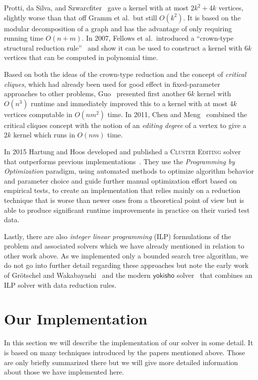 \documentclass[12pt,oneside,english,parskip=full,headings=small]{scrbook}
\theoremstyle{definition}
\begin{document}
Protti, da Silva, and Szwarcfiter~\cite{Protti} gave a kernel with at most $2k^2 + 4k$
vertices, slightly worse than that off Gramm et al.\ but still $O(k^2)$. It is based on the modular
decomposition of a graph and has the advantage of only requiring running time $O(n + m)$. In 2007,
Fellows et al.\ introduced a ``crown-type structural reduction rule''~\cite{Fellows} and show it
can be used to construct a kernel with $6k$ vertices that can be computed in polynomial time.

Based on both the ideas of the crown-type reduction and the concept of \emph{critical cliques},
which had already been used for good effect in fixed-parameter approaches to other problems,
Guo~\cite{Guo} presented first another $6k$ kernel with $O(n^3)$ runtime and immediately improved
this to a kernel with at most $4k$ vertices computable in $O(nm^2)$ time. In 2011, Chen and
Meng~\cite{ChenMeng} combined the critical cliques concept with the notion of an \emph{editing
degree} of a vertex to give a $2k$ kernel which runs in $O(nm)$ time.

In 2015 Hartung and Hoos developed and published a \textsc{Cluster Editing} solver that outperforms
previous implementations~\cite{HartungHoos}. They use the \emph{Programming by Optimization}
paradigm, using automated methods to optimize algorithm behavior and parameter choice and guide
further manual optimization effort based on empirical tests, to create an implementation that relies
mainly on a reduction technique that is worse than newer ones from a theoretical point of view but
is able to produce significant runtime improvements in practice on their varied test data.

Lastly, there are also \emph{integer linear programming} (ILP) formulations of the problem and
associated solvers which we have already mentioned in relation to other work above. As we
implemented only a bounded search tree algorithm, we do not go into further detail regarding these
approaches but note the early work of Grötschel and Wakabayashi~\cite{CuttingPlane} and the modern
$\mathsf{yokisho}$ solver~\cite{yokisho} that combines an ILP solver with data reduction rules.

\chapter{Our Implementation}

In this section we will describe the implementation of our solver in some detail. It is based on
many techniques introduced by the papers mentioned above. Those are only briefly summarized there
but we will give more detailed information about those we have implemented here.
\end{document}
